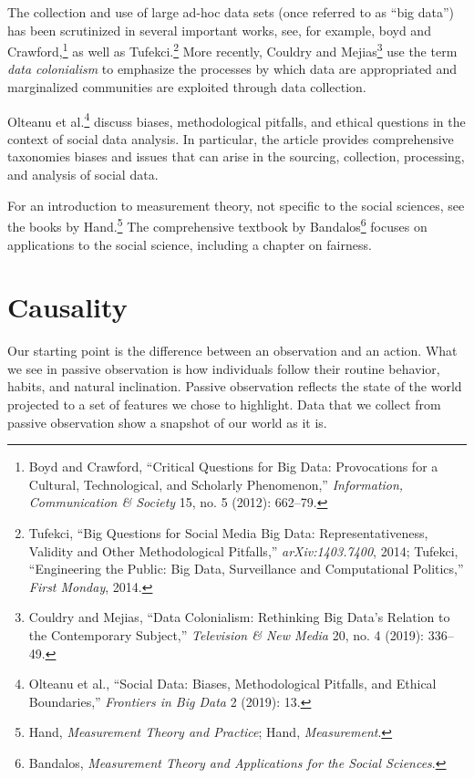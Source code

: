 \documentclass{tufte-book}
\begin{document}
The collection and use of large ad-hoc data sets (once referred to as
``big data'') has been scrutinized in several important works, see, for
example, boyd and Crawford,\footnote{Boyd and Crawford, {``Critical
  Questions for Big Data: Provocations for a Cultural, Technological,
  and Scholarly Phenomenon,''} \emph{Information, Communication \&
  Society} 15, no. 5 (2012): 662--79.} as well as Tufekci.\footnote{Tufekci,
  {``Big Questions for Social Media Big Data: Representativeness,
  Validity and Other Methodological Pitfalls,''} \emph{arXiv:1403.7400},
  2014; Tufekci, {``Engineering the Public: Big Data, Surveillance and
  Computational Politics,''} \emph{First Monday}, 2014.} More recently,
Couldry and Mejias\footnote{Couldry and Mejias, {``Data Colonialism:
  Rethinking Big Data's Relation to the Contemporary Subject,''}
  \emph{Television \& New Media} 20, no. 4 (2019): 336--49.} use the
term \emph{data colonialism} to emphasize the processes by which data
are appropriated and marginalized communities are exploited through data
collection.

Olteanu et al.\footnote{Olteanu et al., {``Social Data: Biases,
  Methodological Pitfalls, and Ethical Boundaries,''} \emph{Frontiers in
  Big Data} 2 (2019): 13.} discuss biases, methodological pitfalls, and
ethical questions in the context of social data analysis. In particular,
the article provides comprehensive taxonomies biases and issues that can
arise in the sourcing, collection, processing, and analysis of social
data.

For an introduction to measurement theory, not specific to the social
sciences, see the books by Hand.\footnote{Hand, \emph{Measurement Theory
  and Practice}; Hand, \emph{Measurement}.} The comprehensive textbook
by Bandalos\footnote{Bandalos, \emph{Measurement Theory and Applications
  for the Social Sciences}.} focuses on applications to the social
science, including a chapter on fairness.

\chapter{Causality}

Our starting point is the difference between an observation and an
action. What we see in passive observation is how individuals follow
their routine behavior, habits, and natural inclination. Passive
observation reflects the state of the world projected to a set of
features we chose to highlight. Data that we collect from passive
observation show a snapshot of our world as it is.
\end{document}
